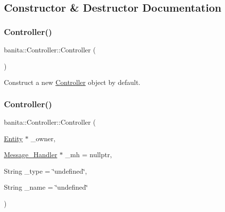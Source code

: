 \subsection{Constructor \& Destructor Documentation}
\mbox{\label{classbanita_1_1_controller_a4455be6d7e7fc0dcb4d5919b45432020}} 
\subsubsection{\texorpdfstring{Controller()}{Controller()}\hspace{0.1cm}{\footnotesize\ttfamily [1/2]}}
{\footnotesize\ttfamily banita\+::\+Controller\+::\+Controller (\begin{DoxyParamCaption}{ }\end{DoxyParamCaption})\hspace{0.3cm}{\ttfamily [protected]}}



Construct a new \mbox{\hyperlink{classbanita_1_1_controller}{Controller}} object by default. 

\mbox{\label{classbanita_1_1_controller_a9c45447d14400317d8419bbca3bad54a}} 
\subsubsection{\texorpdfstring{Controller()}{Controller()}\hspace{0.1cm}{\footnotesize\ttfamily [2/2]}}
{\footnotesize\ttfamily banita\+::\+Controller\+::\+Controller (\begin{DoxyParamCaption}\item[{\mbox{\hyperlink{classbanita_1_1_entity}{Entity}} $\ast$}]{\+\_\+owner,  }\item[{\mbox{\hyperlink{classbanita_1_1_message___handler}{Message\+\_\+\+Handler}} $\ast$}]{\+\_\+mh = {\ttfamily nullptr},  }\item[{String}]{\+\_\+type = {\ttfamily \char`\"{}undefined\char`\"{}},  }\item[{String}]{\+\_\+name = {\ttfamily \char`\"{}undefined\char`\"{}} }\end{DoxyParamCaption})\hspace{0.3cm}{\ttfamily [protected]}}



